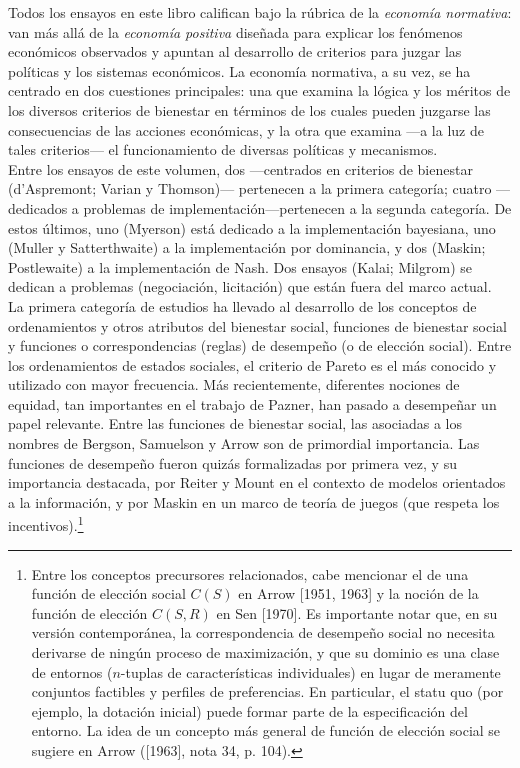 \documentclass[12pt, letterpaper]{article}
\begin{document}
Todos los ensayos en este libro califican bajo la rúbrica de la \textit{economía normativa}: van más allá de la \textit{economía positiva} diseñada para explicar los fenómenos económicos observados y apuntan al desarrollo de criterios para juzgar las políticas y los sistemas económicos. La economía normativa, a su vez, se ha centrado en dos cuestiones principales: una que examina la lógica y los méritos de los diversos criterios de bienestar en términos de los cuales pueden juzgarse las consecuencias de las acciones económicas, y la otra que examina ---a la luz de tales criterios--- el funcionamiento de diversas políticas y mecanismos. \\

Entre los ensayos de este volumen, dos ---centrados en criterios de bienestar (d'Aspremont; Varian y Thomson)--- pertenecen a la primera categoría; cuatro ---dedicados a problemas de implementación---pertenecen a la segunda categoría. De estos últimos, uno (Myerson) está dedicado a la implementación bayesiana, uno (Muller y Satterthwaite) a la implementación por dominancia, y dos (Maskin; Postlewaite) a la implementación de Nash. Dos ensayos (Kalai; Milgrom) se dedican a problemas (negociación, licitación) que están fuera del marco actual. \\

La primera categoría de estudios ha llevado al desarrollo de los conceptos de ordenamientos y otros atributos del bienestar social, funciones de bienestar social y funciones o correspondencias (reglas) de desempeño (o de elección social). Entre los ordenamientos de estados sociales, el criterio de Pareto es el más conocido y utilizado con mayor frecuencia. Más recientemente, diferentes nociones de equidad, tan importantes en el trabajo de Pazner, han pasado a desempeñar un papel relevante. Entre las funciones de bienestar social, las asociadas a los nombres de Bergson, Samuelson y Arrow son de primordial importancia. Las funciones de desempeño fueron quizás formalizadas por primera vez, y su importancia destacada, por Reiter y Mount en el contexto de modelos orientados a la información, y por Maskin en un marco de teoría de juegos (que respeta los incentivos).\footnote{Entre los conceptos precursores relacionados, cabe mencionar el de una función de elección social $C(S)$ en Arrow [1951, 1963] y la noción de la función de elección $C(S, R)$ en Sen [1970]. Es importante notar que, en su versión contemporánea, la correspondencia de desempeño social no necesita derivarse de ningún proceso de maximización, y que su dominio es una clase de entornos ($n$-tuplas de características individuales) en lugar de meramente conjuntos factibles y perfiles de preferencias. En particular, el statu quo (por ejemplo, la dotación inicial) puede formar parte de la especificación del entorno. La idea de un concepto más general de función de elección social se sugiere en Arrow ([1963], nota 34, p. 104).} \\
\end{document}
